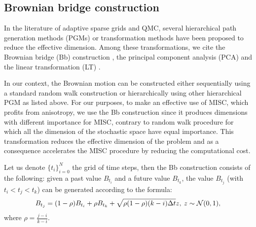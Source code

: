\FloatBarrier

%



\subsection{Brownian bridge construction}\label{sec:Brwonian bridge construction}
In the literature of adaptive sparse grids and  QMC, several hierarchical path generation methods (PGMs) or transformation methods have been proposed to reduce the effective dimension. Among these transformations, we cite  the Brownian
bridge (Bb)  construction \cite{morokoff1994quasi,moskowitz1996smoothness,caflisch1997valuation}, the principal component analysis (PCA)  \cite{acworth1998comparison} and the linear transformation (LT) \cite{imai2004minimizing}.

In our context, the Brownian motion can be constructed either sequentially using a standard random walk construction or hierarchically using   other hierarchical PGM as listed above. For our purposes, to make an effective use of MISC, which profits from anisotropy, we use the Bb construction since it produces  dimensions with different importance for MISC, contrary to random walk procedure for which all the dimension of the stochastic space have equal importance.  This transformation  reduces the effective dimension  of the problem and as a consequence accelerates the MISC procedure by reducing the computational cost.


Let us denote $\{t_i\}_{i=0}^{N}$ the grid of time steps, then the Bb construction \cite{glasserman2004monte} consists of the following: given a past value $B_{t_i}$ and a future value $B_{t_k}$, the value $B_{t_j}$ (with $t_i < t_j < t_k$) can be generated according to the formula:
\begin{equation}
B_{t_j}=(1-\rho) B_{t_i}+\rho B_{t_k}+ \sqrt{\rho (1-\rho)(k-i) \Delta t} z, \: z \sim \mathcal{N}(0,1) ,
\end{equation}
where $\rho=\frac{j-i}{k-i}$.  


